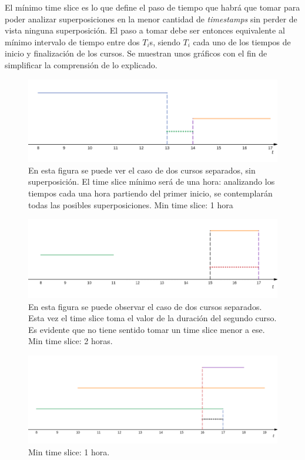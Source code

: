 \documentclass{article}
\begin{document}
El mínimo time slice es lo que define el paso de tiempo que habrá que tomar para poder analizar superposiciones en la menor cantidad de \textit{timestamps} sin perder de vista ninguna superposición. El paso a tomar debe ser entonces equivalente al mínimo intervalo de tiempo entre dos $T_i$s, siendo $T_i$ cada uno de los tiempos de inicio y finalización de los cursos. Se muestran unos gráficos con el fin de simplificar la comprensión de lo explicado.
\begin{figure}[H]
    \centering
    \includegraphics[scale=0.5]{res/intervals01.png} 
    \caption{En esta figura se puede ver el caso de dos cursos separados, sin superposición. El time slice mínimo será de una hora: analizando los tiempos cada una hora partiendo del primer inicio, se contemplarán todas las posibles superposiciones. Min time slice: 1 hora}
\end{figure}
\begin{figure}[H]
    \centering
    \includegraphics[scale=0.5]{res/intervals02.png} 
    \caption{En esta figura se puede observar el caso de dos cursos separados. Esta vez el time slice toma el valor de la duración del segundo curso. Es evidente que no tiene sentido tomar un time slice menor a ese. Min time slice: 2 horas.}
\end{figure}
\begin{figure}[H]
    \centering
    \includegraphics[scale=0.4]{res/intervals03.png} 
    \caption{Min time slice: 1 hora.}
\end{figure}
\end{document}
